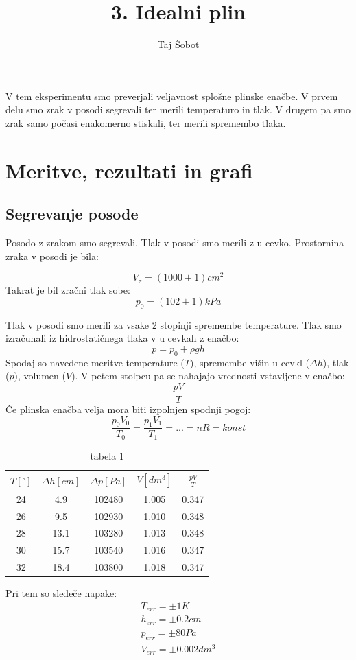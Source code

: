 \documentclass[11pt]{article}
\title{3. Idealni plin}
\author{Taj Šobot}
\begin{document}
    \maketitle
    \flushleft

    V tem eksperimentu smo preverjali veljavnost splošne plinske enačbe.
    V prvem delu smo zrak v posodi segrevali ter merili temperaturo in tlak.
    V drugem pa smo zrak samo počasi enakomerno stiskali, ter merili spremembo tlaka.

    \section{Meritve, rezultati in grafi}

    \subsection{Segrevanje posode}

    Posodo z zrakom smo segrevali.
    Tlak v posodi smo merili z u cevko.
    Prostornina zraka v posodi je bila:

    \[
        V_z = (1000 \pm 1) cm^2
    \]
    Takrat je bil zračni tlak sobe:
    \[
        p_0 = (102 \pm 1)kPa
    \]

    Tlak v posodi smo merili za vsake 2 stopinji spremembe temperature.
    Tlak smo izračunali iz hidrostatičnega tlaka v u cevkah z enačbo:
    \[
        p = p_0 + \rho g h
    \]
    Spodaj so navedene meritve temperature ($T$), spremembe višin u cevkl ($\Delta h$), tlak ($p$), volumen ($V$).
    V petem stolpcu pa se nahajajo vrednosti vstavljene v enačbo:
    \[
        \frac{p V}{T}
    \]
    Če plinska enačba velja mora biti izpolnjen spodnji pogoj:
    \[
        \frac{p_0 V_0}{T_0} = \frac{p_1 V_1}{T_1} = ... = nR = konst
    \]
    \begin{table}[H]
        \centering
        \begin{tabular}{|c|c|c|c|c|}
            \hline
            $T [^\circ]$ & $\Delta h [cm]$ & $\Delta p [Pa]$ & $V [dm^3]$ & $\frac{p V}{T}$\\
            \hline
            24 &  4.9 & 102480 & 1.005 & 0.347 \\
            26 &  9.5 & 102930 & 1.010 & 0.348 \\
            28 & 13.1 & 103280 & 1.013 & 0.348 \\
            30 & 15.7 & 103540 & 1.016 & 0.347 \\
            32 & 18.4 & 103800 & 1.018 & 0.347 \\
            \hline
        \end{tabular}
        \caption{tabela 1}
        \label{tab:1}
    \end{table}
    Pri tem so sledeče napake:
    \begin{align*}
        T_{err} = \pm 1 K \\
        h_{err} = \pm 0.2 cm \\
        p_{err} = \pm 80 Pa \\
        V_{err} = \pm 0.002 dm^3
    \end{align*}
\end{document}
